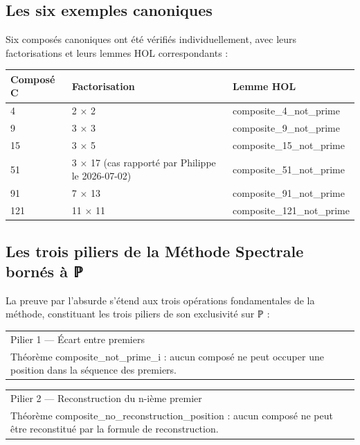\documentclass[11pt,a4paper]{article}
\begin{document}
\subsection{Les six exemples canoniques}

Six composés canoniques ont été vérifiés individuellement, avec leurs factorisations et leurs lemmes HOL correspondants :


\begin{longtable}{|p{}|p{}|p{}|}
\hline
Composé C & Factorisation & Lemme HOL \\
\hline
4 & 2 × 2 & composite\_4\_not\_prime \\
\hline
9 & 3 × 3 & composite\_9\_not\_prime \\
\hline
15 & 3 × 5 & composite\_15\_not\_prime \\
\hline
51 & 3 × 17 (cas rapporté par Philippe le 2026-07-02) & composite\_51\_not\_prime \\
\hline
91 & 7 × 13 & composite\_91\_not\_prime \\
\hline
121 & 11 × 11 & composite\_121\_not\_prime \\
\hline
\end{longtable}


\subsection{Les trois piliers de la Méthode Spectrale bornés à ℙ}

La preuve par l'absurde s'étend aux trois opérations fondamentales de la méthode, constituant les trois piliers de son exclusivité sur ℙ :


\begin{longtable}{|p{}|}
\hline
Pilier 1 — Écart entre premiers \\ Théorème composite\_not\_prime\_i : aucun composé ne peut occuper une position dans la séquence des premiers. \\
\hline
\end{longtable}



\begin{longtable}{|p{}|}
\hline
Pilier 2 — Reconstruction du n-ième premier \\ Théorème composite\_no\_reconstruction\_position : aucun composé ne peut être reconstitué par la formule de reconstruction. \\
\hline
\end{longtable}
\end{document}

